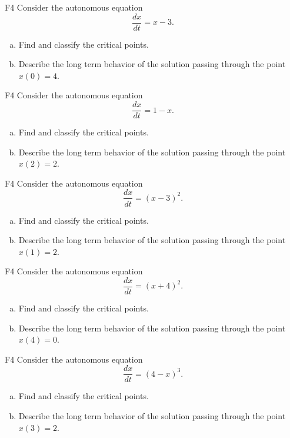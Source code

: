 \begin{problem}{F4}
Consider the autonomous equation
\[
\frac{dx}{dt} = x - 3.
\]
\begin{enumerate}[(a)]
\item Find and classify the critical points.
\item Describe the long term behavior of the solution passing through the point \(x(0)=4\).
\end{enumerate}
\end{problem}

\begin{problem}{F4}
Consider the autonomous equation
\[
\frac{dx}{dt} = 1 - x.
\]
\begin{enumerate}[(a)]
\item Find and classify the critical points.
\item Describe the long term behavior of the solution passing through the point \(x(2)=2\).
\end{enumerate}
\end{problem}

\begin{problem}{F4}
Consider the autonomous equation
\[
\frac{dx}{dt} = (x - 3)^2.
\]\begin{enumerate}[(a)]
\item Find and classify the critical points.
\item Describe the long term behavior of the solution passing through the point \(x(1)=2\).
\end{enumerate}
\end{problem}

\begin{problem}{F4}
Consider the autonomous equation
\[
\frac{dx}{dt} = (x + 4)^2.
\]\begin{enumerate}[(a)]
\item Find and classify the critical points.
\item Describe the long term behavior of the solution passing through the point \(x(4)=0\).
\end{enumerate}
\end{problem}

\begin{problem}{F4}
Consider the autonomous equation
\[
\frac{dx}{dt} = (4 - x)^3.
\]\begin{enumerate}[(a)]
\item Find and classify the critical points.
\item Describe the long term behavior of the solution passing through the point \(x(3)=2\).
\end{enumerate}
\end{problem}

